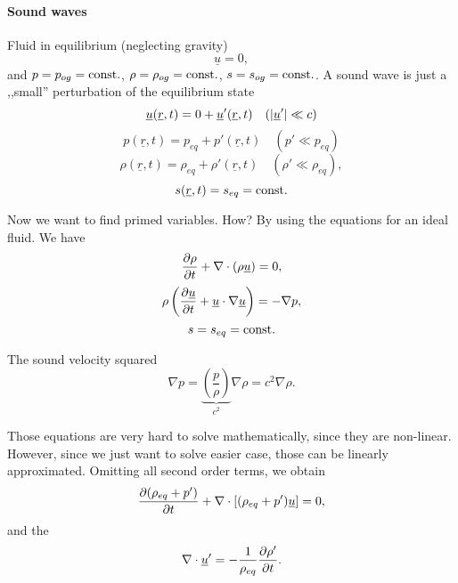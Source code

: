 \documentclass[11pt,oneside]{book}
\renewcommand{\vec}[1]{\underline{#1}}
\theoremstyle{definition} %
\theoremstyle{plain} %
\theoremstyle{remark} %
\theoremstyle{underline}
\begin{document}
  \paragraph{Sound waves}
  Fluid in equilibrium (neglecting gravity)
  \begin{displaymath}
    \vec u = 0,
  \end{displaymath}
  and $p = p_{og} = \textrm{const}.$, $\rho = \rho_{og} = \textrm{const}.$, $s = s_{og} = \textrm{const}.$.
  A sound wave is just a ,,small'' perturbation of the equilibrium state
  \begin{displaymath}
    \vec u ( \vec r, t) = 0 + \vec u ' (\vec r, t)  \quad (\abs{\vec u'} \ll c)
  \end{displaymath}
  \begin{displaymath}
    p ( \vec r, t) = p_{eq} + p' (\vec r, t)  \quad (p' \ll p_{eq})
  \end{displaymath}
  \begin{displaymath}
    \rho ( \vec r, t) = \rho_{eq} + \rho' (\vec r, t)  \quad (\rho ' \ll \rho_{eq}),
  \end{displaymath}
  \begin{displaymath}
    s( \vec r, t) = s_{eq} = \const.
  \end{displaymath}

  Now we want to find primed variables.
  How? By using the equations for an ideal fluid.
  We have
  \begin{equation}
    \ptf{\rho}{t} + \nabla \cdot (\rho \vec u) = 0,
  \end{equation}
  \begin{equation}
    \rho \left( \ptf{\vec u}{t} + \vec u \cdot \nabla\vec u \right) = - \nabla p,
    \label{eq:3.3}
  \end{equation}
  \begin{equation}
    s = s_{eq} = \textrm{const}.
  \end{equation}

  The sound velocity squared
  \begin{displaymath}
    \nabla p = \underbrace{\left( \dfrac{p}{\rho} \right)}_{c^2}\nabla \rho = c^2 \nabla \rho.
  \end{displaymath}
  
  Those equations are very hard to solve mathematically, since they are non-linear.
  However, since we just want to solve easier case, those can be linearly approximated.
  Omitting all second order terms, we obtain %
  \begin{displaymath}
    \ptf{(\rho_{eq} + p')}{t} + \nabla \cdot \left[ (\rho_{eq} + p') \vec u \right] = 0,
  \end{displaymath}
  and the 
  \begin{equation}
    \nabla \cdot \vec u' = - \frac{1}{\rho_{eq}} \ptf{\rho'}{t}.
    \label{eq:lincont}
  \end{equation}
\end{document}
